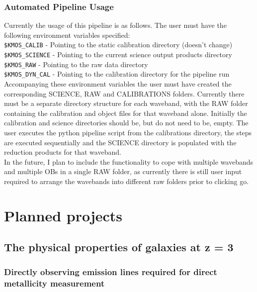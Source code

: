 \documentclass{literature}
\begin{document}
\subsubsection{Automated Pipeline Usage}
Currently the usage of this pipeline is as follows. The user must have the following environment variables specified: \\ 

\noindent
{\tt{\$KMOS\_CALIB}} - Pointing to the static calibration directory (doesn't change) \\
\noindent
{\tt{\$KMOS\_SCIENCE}} - Pointing to the current science output products directory \\
\noindent
{\tt{\$KMOS\_RAW}} - Pointing to the raw data directory \\
\noindent
{\tt{\$KMOS\_DYN\_CAL}} - Pointing to the calibration directory for the pipeline run \\

\noindent
Accompanying these environment variables the user must have created the corresponding SCIENCE, RAW and CALIBRATIONS folders. Currently there must be a separate directory structure for each waveband, with the RAW folder containing the calibration and object files for that waveband alone. Initially the calibration and science directories should be, but do not need to be, empty. The user executes the python pipeline script from the calibrations directory, the steps are executed sequentially and the SCIENCE directory is populated with the reduction products for that waveband. \\
In the future, I plan to include the functionality to cope with multiple wavebands and multiple OBs in a single RAW folder, as currently there is still user input required to arrange the wavebands into different raw folders prior to clicking go.   



\section{Planned projects}\label{sec:projects}
\subsection{The physical properties of galaxies at z = 3}

\subsubsection{Directly observing emission lines required for direct metallicity measurement}
\end{document}
